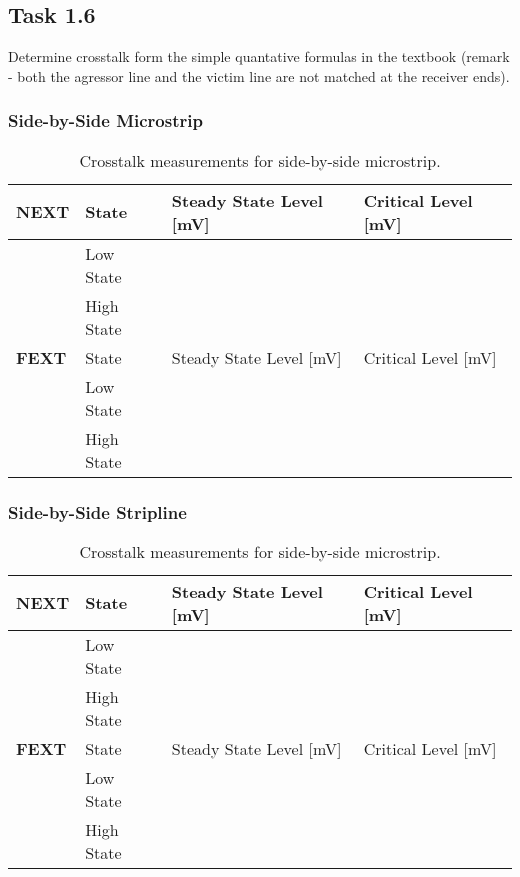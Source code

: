 \documentclass[../main.tex]{subfiles}
\begin{document}
\subsection{Task 1.6}

Determine crosstalk form the simple quantative formulas in the textbook (remark - both the agressor line and the victim line are not matched at the receiver ends).

\solution

\subsubsection{Side-by-Side Microstrip}

\begin{table}[h]
    \centering
    \begin{tabular}{l l|l l}
        \toprule[1pt]
        \textbf{NEXT} & State & Steady State Level [mV] & Critical Level [mV] \\
        \midrule
        & Low State & & \\
        & High State & & \\
        \midrule[1pt]
        \textbf{FEXT} & State & Steady State Level [mV] & Critical Level [mV] \\
        \midrule
        & Low State & & \\
        & High State & & \\
        \bottomrule[1pt]
    \end{tabular}
    \caption{Crosstalk measurements for side-by-side microstrip.}
    \label{tab:calc-side-by-side-microstrip}
\end{table}

\subsubsection{Side-by-Side Stripline}

\begin{table}[h]
    \centering
    \begin{tabular}{l l|l l}
        \toprule[1pt]
        \textbf{NEXT} & State & Steady State Level [mV] & Critical Level [mV] \\
        \midrule
        & Low State & & \\
        & High State & & \\
        \midrule[1pt]
        \textbf{FEXT} & State & Steady State Level [mV] & Critical Level [mV] \\
        \midrule
        & Low State & & \\
        & High State & & \\
        \bottomrule[1pt]
    \end{tabular}
    \caption{Crosstalk measurements for side-by-side microstrip.}
    \label{tab:calc-side-by-side-stripline}
\end{table}
\end{document}
